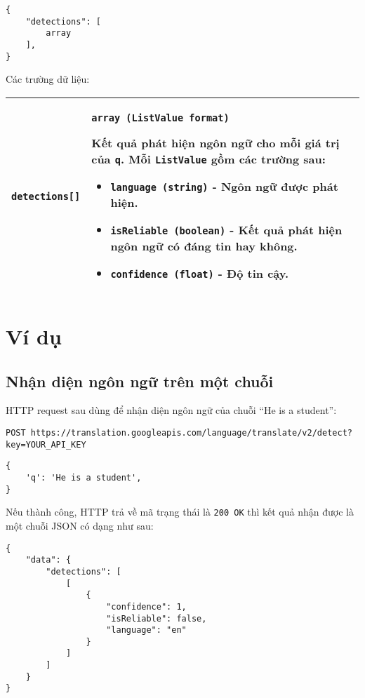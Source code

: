 \documentclass[../thesis.tex]{subfiles}
\begin{document}
\begin{lstlisting}[style=link]
{
	"detections": [
		array
	],
}
\end{lstlisting}

Các trường dữ liệu:
\begin{center}
\begin{tabularx}{\textwidth}{|p{}|X|}
\hline
\lstinline{detections[]} & \lstinline{array (ListValue format)}

Kết quả phát hiện ngôn ngữ cho mỗi giá trị của \lstinline{q}. Mỗi \lstinline{ListValue} gồm các trường sau:

\begin{itemize}
  \item \lstinline{language (string)} - Ngôn ngữ được phát hiện.
  \item \lstinline{isReliable (boolean)} - Kết quả phát hiện ngôn ngữ có đáng tin hay không.
  \item \lstinline{confidence (float)} - Độ tin cậy.
\end{itemize}
\\
\hline
\end{tabularx}
\end{center}

\section{Ví dụ}
\subsection{Nhận diện ngôn ngữ trên một chuỗi}
HTTP request sau dùng để nhận diện ngôn ngữ của chuỗi ``He is a student'':
\begin{lstlisting}[style=link]
POST https://translation.googleapis.com/language/translate/v2/detect?key=YOUR_API_KEY
\end{lstlisting}
\begin{lstlisting}[style=link]
{
	'q': 'He is a student',
}
\end{lstlisting}

Nếu thành công, HTTP trả về mã trạng thái là \lstinline{200 OK} thì kết quả nhận được là một chuỗi JSON có dạng như sau:

\begin{lstlisting}[style=link]
{
	"data": {
		"detections": [
			[
				{
					"confidence": 1,
					"isReliable": false,
					"language": "en"
				}
			]
		]
	}
}
\end{lstlisting}
\end{document}
